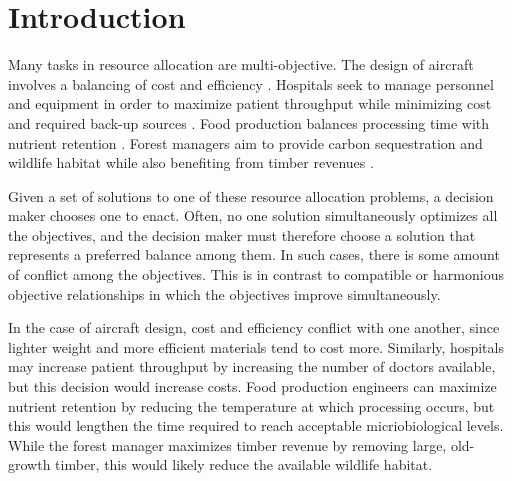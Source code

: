 
\section{Introduction}
\label{sec:intro}

Many tasks in resource allocation are multi-objective. The design of aircraft involves a balancing of cost and efficiency \cite{wang2014multi}. Hospitals seek to manage personnel and equipment in order to maximize patient throughput while minimizing cost and required back-up sources \cite{hutzschenreuter2009evolutionary}. Food production balances processing time with nutrient retention \cite{sendin2010efficient}. Forest managers aim to provide carbon sequestration and wildlife habitat while also benefiting from timber revenues \cite{toth2013ecosel}.

Given a set of solutions to one of these resource allocation problems, a decision maker chooses one to enact. Often, no one solution simultaneously optimizes all the objectives, and the decision maker must therefore choose a solution that represents a preferred balance among them. In such cases, there is some amount of conflict among the objectives. This is in contrast to compatible or harmonious objective relationships in which the objectives improve simultaneously.

In the case of aircraft design, cost and efficiency conflict with one another, since lighter weight and more efficient materials tend to cost more. Similarly, hospitals may increase patient throughput by increasing the number of doctors available, but this decision would increase costs. Food production engineers can maximize nutrient retention by reducing the temperature at which processing occurs, but this would lengthen the time required to reach acceptable micriobiological levels. While the forest manager maximizes timber revenue by removing large, old-growth timber, this would likely reduce the available wildlife habitat.%


